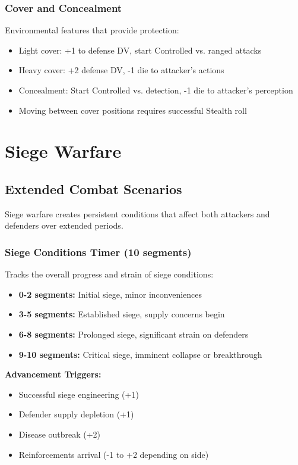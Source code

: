 \documentclass[11pt,letterpaper]{article}
\begin{document}
\subsubsection{Cover and Concealment}

Environmental features that provide protection:
\begin{itemize}[leftmargin=*]
    \item Light cover: +1 to defense DV, start Controlled vs. ranged attacks
    \item Heavy cover: +2 defense DV, -1 die to attacker's actions
    \item Concealment: Start Controlled vs. detection, -1 die to attacker's perception
    \item Moving between cover positions requires successful Stealth roll
\end{itemize}

\newpage

\section{Siege Warfare}

\subsection{Extended Combat Scenarios}

Siege warfare creates persistent conditions that affect both attackers and defenders over extended periods.

\subsubsection{Siege Conditions Timer (10 segments)}

Tracks the overall progress and strain of siege conditions:
\begin{itemize}[leftmargin=*]
    \item \textbf{0-2 segments:} Initial siege, minor inconveniences
    \item \textbf{3-5 segments:} Established siege, supply concerns begin
    \item \textbf{6-8 segments:} Prolonged siege, significant strain on defenders
    \item \textbf{9-10 segments:} Critical siege, imminent collapse or breakthrough
\end{itemize}

\textbf{Advancement Triggers:}
\begin{itemize}[leftmargin=*]
    \item Successful siege engineering (+1)
    \item Defender supply depletion (+1)
    \item Disease outbreak (+2)
    \item Reinforcements arrival (-1 to +2 depending on side)
\end{itemize}
\end{document}

